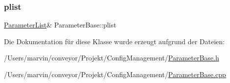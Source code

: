 \subsubsection{\texorpdfstring{plist}{plist}}
{\footnotesize\ttfamily \hyperlink{class_parameter_list}{Parameter\+List}\& Parameter\+Base\+::plist}



Die Dokumentation für diese Klasse wurde erzeugt aufgrund der Dateien\+:\begin{DoxyCompactItemize}
\item 
/\+Users/marvin/conveyor/\+Projekt/\+Config\+Management/\hyperlink{_parameter_base_8h}{Parameter\+Base.\+h}\item 
/\+Users/marvin/conveyor/\+Projekt/\+Config\+Management/\hyperlink{_parameter_base_8cpp}{Parameter\+Base.\+cpp}\end{DoxyCompactItemize}
